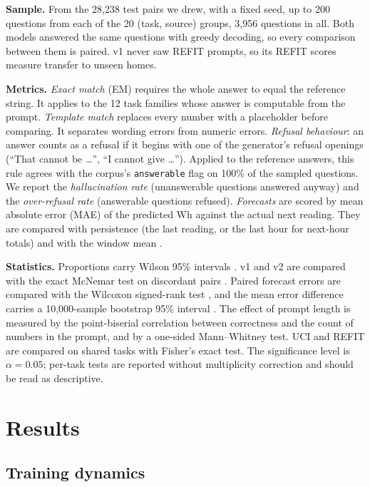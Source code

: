 \documentclass[conference]{IEEEtran}
\begin{document}
\textbf{Sample.} From the 28{,}238 test pairs we drew, with a fixed seed, up to 200 questions from each of the 20
(task, source) groups, 3{,}956 questions in all. Both models answered the same questions with greedy decoding, so
every comparison between them is paired. v1 never saw REFIT prompts, so its REFIT scores measure transfer to unseen
homes.

\textbf{Metrics.}
\emph{Exact match} (EM) requires the whole answer to equal the reference string. It applies to the 12 task families
whose answer is computable from the prompt.
\emph{Template match} replaces every number with a placeholder before comparing. It separates wording errors from
numeric errors.
\emph{Refusal behaviour}: an answer counts as a refusal if it begins with one of the generator's refusal openings
(``That cannot be \ldots'', ``I cannot give \ldots''). Applied to the reference answers, this rule agrees with the
corpus's \texttt{answerable} flag on 100\% of the sampled questions. We report the \emph{hallucination rate} (unanswerable
questions answered anyway) and the \emph{over-refusal rate} (answerable questions refused).
\emph{Forecasts} are scored by mean absolute error (MAE) of the predicted Wh against the actual next reading. They
are compared with persistence (the last reading, or the last hour for next-hour totals) and with the window mean
\cite{hyndman2021fpp3}.

\textbf{Statistics.} Proportions carry Wilson 95\% intervals \cite{wilson1927}. v1 and v2 are compared with the
exact McNemar test on discordant pairs \cite{mcnemar1947}. Paired forecast errors are compared with the Wilcoxon
signed-rank test \cite{wilcoxon1945}, and the mean error difference carries a 10{,}000-sample bootstrap 95\%
interval \cite{efron1979}. The effect of prompt length is measured by the point-biserial correlation between
correctness and the count of numbers in the prompt, and by a one-sided Mann--Whitney test. UCI and REFIT are compared
on shared tasks with Fisher's exact test. The significance level is $\alpha=0.05$; per-task tests are reported
without multiplicity correction and should be read as descriptive.

\section{Results}

\subsection{Training dynamics}
\end{document}
